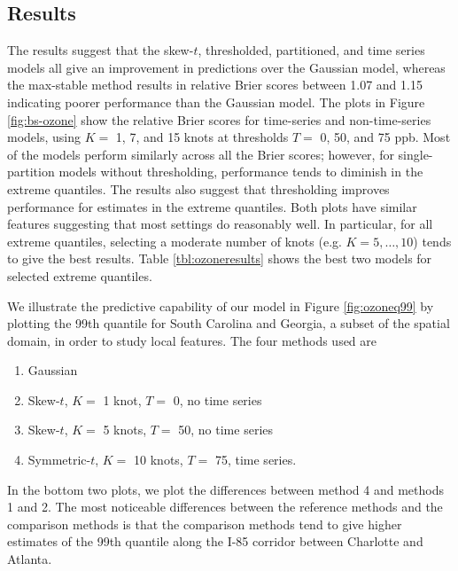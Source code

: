 \documentclass[useAMS,usenatbib,referee]{biom}
\begin{document}
\subsection{Results}\label{s:results}
The results suggest that the skew-$t$, thresholded, partitioned, and time series models all give an improvement in predictions over the Gaussian model, whereas the max-stable method results in relative Brier scores between 1.07 and 1.15 indicating poorer performance than the Gaussian model.
The plots in Figure \ref{fig:bs-ozone} show the relative Brier scores for time-series and non-time-series models, using $K = $ 1, 7, and 15 knots at thresholds $T = $ 0, 50, and 75 ppb.
Most of the models perform similarly across all the Brier scores; however, for single-partition models without thresholding, performance tends to diminish in the extreme quantiles.
The results also suggest that thresholding improves performance for estimates in the extreme quantiles.
Both plots have similar features suggesting that most settings do reasonably well.
In particular, for all extreme quantiles, selecting a moderate number of knots (e.g. $K = 5, \ldots, 10$) tends to give the best results.
Table \ref{tbl:ozoneresults} shows the best two models for selected extreme quantiles.

We illustrate the predictive capability of our model in Figure \ref{fig:ozoneq99} by plotting the 99th quantile for South Carolina and Georgia, a subset of the spatial domain, in order to study local features.
The four methods used are
 \begin{enumerate} [leftmargin=3em]
  \item Gaussian
  \item Skew-$t$, $K =$ 1 knot, $T = $ 0, no time series
  \item Skew-$t$, $K =$ 5 knots, $T = $ 50, no time series
  \item Symmetric-$t$, $K =$ 10 knots, $T = $ 75, time series.
 \end{enumerate} 
In the bottom two plots, we plot the differences between method 4 and methods 1 and 2.
The most noticeable differences between the reference methods and the comparison methods is that the comparison methods tend to give higher estimates of the 99th quantile along the I-85 corridor between Charlotte and Atlanta.
\end{document}
